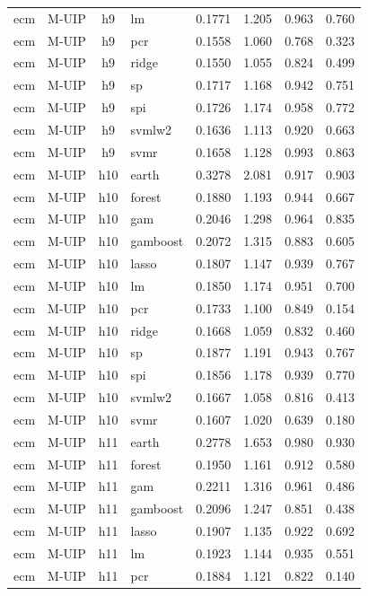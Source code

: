 \begin{ThreePartTable}
\begin{longtable}[t]{llclcccc}
ecm & M-UIP & h9 & lm & 0.1771 & 1.205 & 0.963 & 0.760\\
ecm & M-UIP & h9 & pcr & 0.1558 & 1.060 & 0.768 & 0.323\\
ecm & M-UIP & h9 & ridge & 0.1550 & 1.055 & 0.824 & 0.499\\
ecm & M-UIP & h9 & sp & 0.1717 & 1.168 & 0.942 & 0.751\\
ecm & M-UIP & h9 & spi & 0.1726 & 1.174 & 0.958 & 0.772\\
ecm & M-UIP & h9 & svmlw2 & 0.1636 & 1.113 & 0.920 & 0.663\\
ecm & M-UIP & h9 & svmr & 0.1658 & 1.128 & 0.993 & 0.863\\
\addlinespace
ecm & M-UIP & h10 & earth & 0.3278 & 2.081 & 0.917 & 0.903\\
ecm & M-UIP & h10 & forest & 0.1880 & 1.193 & 0.944 & 0.667\\
ecm & M-UIP & h10 & gam & 0.2046 & 1.298 & 0.964 & 0.835\\
ecm & M-UIP & h10 & gamboost & 0.2072 & 1.315 & 0.883 & 0.605\\
ecm & M-UIP & h10 & lasso & 0.1807 & 1.147 & 0.939 & 0.767\\
ecm & M-UIP & h10 & lm & 0.1850 & 1.174 & 0.951 & 0.700\\
ecm & M-UIP & h10 & pcr & 0.1733 & 1.100 & 0.849 & 0.154\\
ecm & M-UIP & h10 & ridge & 0.1668 & 1.059 & 0.832 & 0.460\\
ecm & M-UIP & h10 & sp & 0.1877 & 1.191 & 0.943 & 0.767\\
ecm & M-UIP & h10 & spi & 0.1856 & 1.178 & 0.939 & 0.770\\
ecm & M-UIP & h10 & svmlw2 & 0.1667 & 1.058 & 0.816 & 0.413\\
ecm & M-UIP & h10 & svmr & 0.1607 & 1.020 & 0.639 & 0.180\\
\addlinespace
ecm & M-UIP & h11 & earth & 0.2778 & 1.653 & 0.980 & 0.930\\
ecm & M-UIP & h11 & forest & 0.1950 & 1.161 & 0.912 & 0.580\\
ecm & M-UIP & h11 & gam & 0.2211 & 1.316 & 0.961 & 0.486\\
ecm & M-UIP & h11 & gamboost & 0.2096 & 1.247 & 0.851 & 0.438\\
ecm & M-UIP & h11 & lasso & 0.1907 & 1.135 & 0.922 & 0.692\\
ecm & M-UIP & h11 & lm & 0.1923 & 1.144 & 0.935 & 0.551\\
ecm & M-UIP & h11 & pcr & 0.1884 & 1.121 & 0.822 & 0.140\\

\end{longtable}
\end{ThreePartTable}
